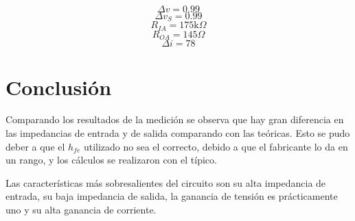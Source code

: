 \documentclass[../../main.tex]{subfiles}
\begin{document}
$$\Delta v = 0.99$$
$$ \Delta v_S =0.99 $$
$$ R_{IA} = 175\mathrm{k}\Omega $$
$$R_{OA}=145\Omega $$
$$\Delta i= 78 $$


\section{Conclusión}
Comparando los resultados de la medición se observa que hay gran diferencia en las impedancias de entrada y de salida comparando con las te\'oricas. Esto se pudo deber a que el $h_{fe}$ utilizado no sea el correcto, debido a que el fabricante lo da en un rango, y los cálculos se realizaron con el t\'ipico. 
\par Las características más sobresalientes del circuito son su alta impedancia de entrada, su baja impedancia de salida, la ganancia de tensión es prácticamente uno y su alta ganancia de corriente.
\end{document}

